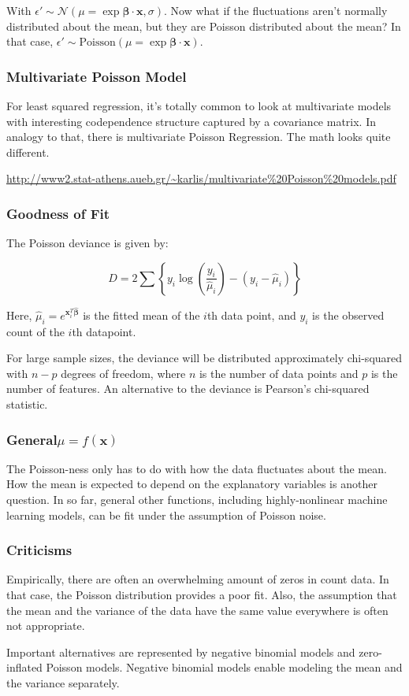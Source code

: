 With $\epsilon' \sim \mathscr{N}(\mu = \exp{\mathbf{\beta \cdot x}},\sigma)$. Now what if the fluctuations aren't normally distributed about the mean, but they are Poisson distributed about the mean? In that case, $\epsilon' \sim \mathrm{Poisson}(\mu = \exp{\mathbf{\beta \cdot x}})$. 



\subsubsection{Multivariate Poisson Model}
For least squared regression, it's totally common to look at multivariate models with interesting codependence structure captured by a covariance matrix. In analogy to that, there is multivariate Poisson Regression. The math looks quite different. 

\url{http://www2.stat-athens.aueb.gr/~karlis/multivariate%20Poisson%20models.pdf}

\subsubsection{Goodness of Fit}
The Poisson deviance is given by:

\begin{equation}
D = 2\sum\left\{ y_i \log\left( \frac{y_i}{\hat{\mu}_i} \right) - \left( y_i - \hat{\mu}_i \right) \right\}
\end{equation}

Here, $\hat{\mu}_i = e^{\mathbf{x}^T_i \hat{\mathbf{\beta}}}$ is the fitted mean of the $i$th data point, and $y_i$ is the observed count of the $i$th datapoint. 

For large sample sizes, the deviance will be distributed approximately chi-squared with $n-p$ degrees of freedom, where $n$ is the number of data points and $p$ is the number of features. An alternative to the deviance is Pearson's chi-squared statistic. 

\subsubsection{General$\mu = f(\mathbf{x})$}
The Poisson-ness only has to do with how the data fluctuates about the mean. How the mean is expected to depend on the explanatory variables is another question. In so far, general other functions, including highly-nonlinear machine learning models, can be fit under the assumption of Poisson noise.


\subsubsection{Criticisms}

Empirically, there are often an overwhelming amount of zeros in count data. In that case, the Poisson distribution provides a poor fit. Also, the assumption that the mean and the variance of the data have the same value everywhere is often not appropriate. 

Important alternatives are represented by negative binomial models and zero-inflated Poisson models. Negative binomial models enable modeling the mean and the variance separately.
